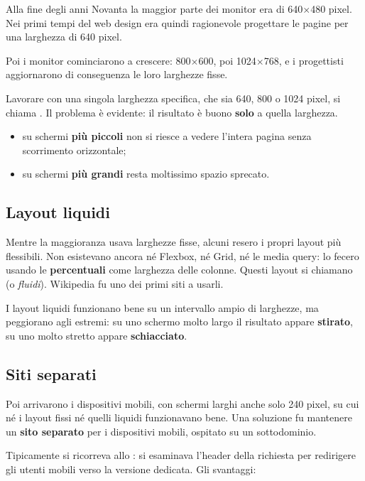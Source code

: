 Alla fine degli anni Novanta la maggior parte dei monitor era di 640$\times$480
pixel. Nei primi tempi del web design era quindi ragionevole progettare le
pagine per una larghezza di 640 pixel.

Poi i monitor cominciarono a crescere: 800$\times$600, poi 1024$\times$768, e
i progettisti aggiornarono di conseguenza le loro larghezze fisse.

Lavorare con una singola larghezza specifica, che sia 640, 800 o 1024 pixel, si
chiama . Il problema è evidente: il risultato è buono
\textbf{solo} a quella larghezza.

\begin{itemize}
  \item su schermi \textbf{più piccoli} non si riesce a vedere l'intera pagina
        senza scorrimento orizzontale;
  \item su schermi \textbf{più grandi} resta moltissimo spazio sprecato.
\end{itemize}

\subsection{Layout liquidi}

Mentre la maggioranza usava larghezze fisse, alcuni resero i propri layout più
flessibili. Non esistevano ancora né Flexbox, né Grid, né le media query: lo
fecero usando le \textbf{percentuali} come larghezza delle colonne. Questi
layout si chiamano  (o \textit{fluidi}). Wikipedia fu uno dei
primi siti a usarli.

I layout liquidi funzionano bene su un intervallo ampio di larghezze, ma
peggiorano agli estremi: su uno schermo molto largo il risultato appare
\textbf{stirato}, su uno molto stretto appare \textbf{schiacciato}.

\subsection{Siti separati}

Poi arrivarono i dispositivi mobili, con schermi larghi anche solo 240 pixel,
su cui né i layout fissi né quelli liquidi funzionavano bene. Una soluzione fu
mantenere un \textbf{sito separato} per i dispositivi mobili, ospitato su un
sottodominio.

Tipicamente si ricorreva allo : si esaminava l'header
 della richiesta per redirigere gli utenti mobili verso la
versione dedicata. Gli svantaggi:

